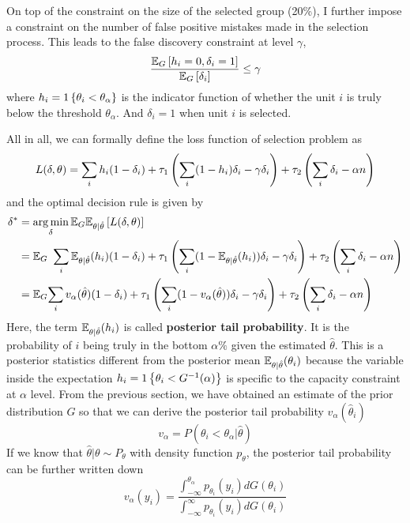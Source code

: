 \documentclass[12pt]{article}
\begin{document}
On top of the constraint on the size of the selected group (20\%), I further
impose a constraint on the number of false positive mistakes made in the
selection process. This leads to the false discovery constraint at level
$\gamma$,
\begin{equation*}
    \frac{\mathbb{E}_G\left[h_i=0,\delta_i=1\right]}{\mathbb{E}_G\left[\delta_i\right]} \le \gamma
\end{equation*} where $h_i=1\left\{\theta_i<\theta_\alpha\right\}$ is the indicator function of whether the unit $i$ is truly below the threshold $\theta_\alpha$. And $\delta_i=1$ when unit $i$ is selected.

All in all, we can formally define the loss function of selection problem as
\begin{equation*}
    L(\delta,\theta)=\sum_i h_i(1-\delta_i) +\tau_1\left(\sum_i (1-h_i)\delta_i -\gamma \delta_i\right) + \tau_2 \left(\sum_i \delta_i -\alpha n\right)
\end{equation*}
and the optimal decision rule is given by
\begin{equation*}
    \begin{split}
        \delta^*& =\operatorname*{arg\,min}_\delta \mathbb{E}_G\mathbb{E}_{\theta|\hat{\theta}}\left[L(\delta,\theta)\right]                                                                                                       \\
        &= \mathbb{E}_G \ \sum_i \mathbb{E}_{\theta|\hat{\theta}}(h_i)(1-\delta_i) +\tau_1\left(\sum_i (1-\mathbb{E}_{\theta|\hat{\theta}}(h_i))\delta_i -\gamma \delta_i\right) + \tau_2 \left(\sum_i \delta_i -\alpha n\right)            \\
        & =\mathbb{E}_G{\sum_i v_\alpha(\hat{\theta})(1-\delta_i) +\tau_1\left(\sum_i (1-v_\alpha(\hat{\theta}))\delta_i -\gamma \delta_i\right) + \tau_2 \left(\sum_i \delta_i -\alpha n\right)}
    \end{split}
\end{equation*}
Here, the term $\mathbb{E}_{\theta|\hat{\theta}}(h_i)$ is called \textbf{posterior tail probability}. It is the probability of $i$ being truly in the bottom $\alpha\%$ given the estimated $\hat{\theta}$.
This is a posterior statistics different from the posterior mean $\mathbb{E}_{\theta|\hat{\theta}}(\theta_i)$ because the variable inside the expectation $h_i=1\left\{\theta_i<G^{-1}(\alpha)\right\}$ is specific to the capacity constraint at $\alpha$ level.
From the previous section, we have obtained an estimate of the prior distribution $G$ so that we can derive the posterior tail probability $v_\alpha(\hat{\theta}_i)$
\begin{equation*}
    v_\alpha=P( \theta_i < \theta_{\alpha} |\hat{\theta})
\end{equation*}
If we know that $\hat{\theta}|\theta \sim P_\theta$ with density function $p_\theta$, the posterior tail probability can be further written down
\begin{equation*}
    v_\alpha(y_i)=\frac{{\int_{-\infty}^{\theta_{\alpha}} p_{\theta_i}(y_i) dG(\theta_i)}}
    {{\int_{-\infty}^{\infty} p_{\theta_i}(y_i) dG(\theta_i)}}
\end{equation*}
\end{document}
